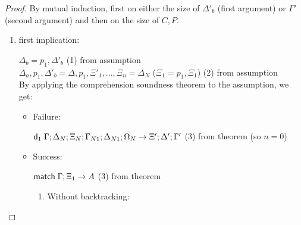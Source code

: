 \begin{proof}
   By mutual induction, first on either the size of $\Delta'_b$ (first argument) or $\Gamma'$ (second argument) and then on the size of $C, P$.
   
   \begin{enumerate}
      \item first implication:
      
      $\Delta_b = p_1, \Delta'_b$ \hfill (1) from assumption \\
      $\Delta_a, p_1, \Delta'_b = \Delta, p_1, \Xi'_1, ..., \Xi_n = \Delta_N$ ($\Xi_1 = p_1, \Xi_1$) \hfill (2) from assumption \\
      By applying the comprehension soundness theorem to the assumption, we get:
      
      \begin{itemize}
         \item Failure:
         
         $\mathsf{d}_1 \; \Gamma; \Delta_N; \Xi_N; \Gamma_{N1}; \Delta_{N1}; \Omega_N \rightarrow \Xi'; \Delta'; \Gamma'$ \hfill (3) from theorem (so $n = 0$)\\
         
         \item Success:
         
         $\mathsf{match} \; \Gamma; \Xi_1 \rightarrow A$ \hfill (3) from theorem \\
         
         \begin{enumerate}
            \item Without backtracking:
            

\end{enumerate}
\end{itemize}
\end{enumerate}
\end{proof}
